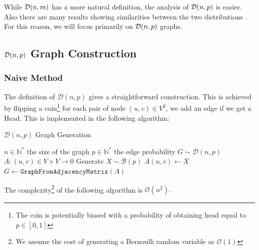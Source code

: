 While $\mathcal{D}(n,m)$ has a more natural definition, the analysis of $\mathcal{D}(n,p)$ is easier. Also there are many results showing similarities between the two distributions \cite[Section.~1.1]{RandomGraphs}. For this reason, we will focus primarily on $\mathcal{D}(n,p)$ graphs.

\subsection{$\mathcal{D}(n,p)$ Graph Construction}

\subsubsection{Naive Method}
The definition of $\mathcal{D}(n,p)$ gives a straightforward construction. \newline
This is achieved by flipping a coin\footnote{The coin is potentially biased with a probability of obtaining head equal to $p\in [0,1]$} for each pair of node $(u,v)\in V^2$, we add an edge if we get a Head. 
\newline This is implemented in the following algorithm:
\begin{algorithm}
	\caption{$\mathcal{D}(n,p)$ Graph Generation}\label{alg:Dnp_Naive}
	\begin{algorithmic}
		\Require $n\in\mathbb{N}^*$ the size of the graph
		\Require $p\in\mathbb{N}^*$ the edge probability 
		\Ensure $G\sim \mathcal{D}(n,p)$  
		\State $A:(u,v)\in V\times V\rightarrow 0$
		\State Generate $X\sim \mathcal{B}(p)$
		\State $A(u,v)\leftarrow X$
		\EndFor
		\EndFor
		\State \Return $G\leftarrow \texttt{GraphFromAdjacencyMatrix}(A)$
	\end{algorithmic}
\end{algorithm}
\FloatBarrier
The complexity\footnote{We assume the cost of generating a Bernoulli random variable as $\mathcal{O}(1)$} of the following algorithm is $\mathcal{O}(n^2).$
